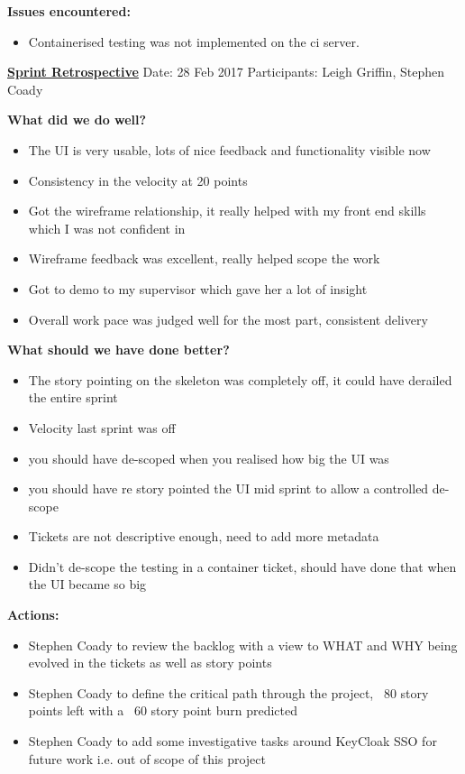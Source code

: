 \textbf{Issues encountered:}
\begin{itemize}
	\item Containerised testing was not implemented on the \gls{ci} server.
\end{itemize}

\underline{\textbf{Sprint Retrospective}}\newline
Date: 28 Feb 2017\newline
Participants: Leigh Griffin, Stephen Coady

\textbf{What did we do well?}
\begin{itemize}
	\item The UI is very usable, lots of nice feedback and functionality visible now
	\item Consistency in the velocity at 20 points
	\item Got the wireframe relationship, it really helped with my front end skills which I was not confident in
	\item Wireframe feedback was excellent, really helped scope the work
	\item Got to demo to my supervisor which gave her a lot of insight
	\item Overall work pace was judged well for the most part, consistent delivery
\end{itemize}
\textbf{What should we have done better?}
\begin{itemize}
	\item The story pointing on the skeleton was completely off, it could have derailed the entire sprint
	\item Velocity last sprint was off 
	\item you should have de-scoped when you realised how big the UI was
	\item you should have re story pointed the UI mid sprint to allow a controlled de-scope
	\item Tickets are not descriptive enough, need to add more metadata
	\item Didn't de-scope the testing in a container ticket, should have done that when the UI became so big
\end{itemize}

\textbf{Actions:}
\begin{itemize}
	\item Stephen Coady to review the backlog with a view to WHAT and WHY being evolved in the tickets as well as story points
	\item Stephen Coady to define the critical path through the project, ~80 story points left with a ~60 story point burn predicted
	\item Stephen Coady to add some investigative tasks around KeyCloak SSO for future work i.e. out of scope of this project
\end{itemize}

